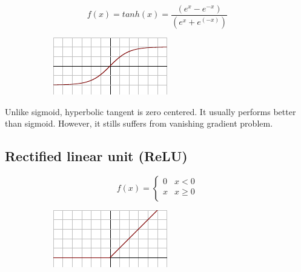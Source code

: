 \begin{figure}[H]
\raggedright
\begin{subfigure}{.5\textwidth}
  \centering
  \[ f(x) = tanh(x) = \frac{(e^x - e^{-x})}{(e^x + e^{(-x)})} \]
\end{subfigure}%
\begin{subfigure}{.25\textwidth}
  \centering
  \includegraphics[width=\textwidth]{tex/images/activation/tanh}
\end{subfigure}
\end{figure}

\noindent
Unlike sigmoid, hyperbolic tangent is zero centered. It usually performs better than sigmoid. However, it stills suffers from vanishing gradient problem.

\subsection*{Rectified linear unit (ReLU)}

\begin{figure}[H]
\raggedright
\begin{subfigure}{.35\textwidth}
  \centering
   \[
f(x) = \begin{cases}
       0 & x < 0 \\
       x & x \geq 0 \\
     \end{cases} \]  
\end{subfigure}%
\begin{subfigure}{.25\textwidth}
  \centering
  \includegraphics[width=\textwidth]{tex/images/activation/relu}
\end{subfigure}
\end{figure}

